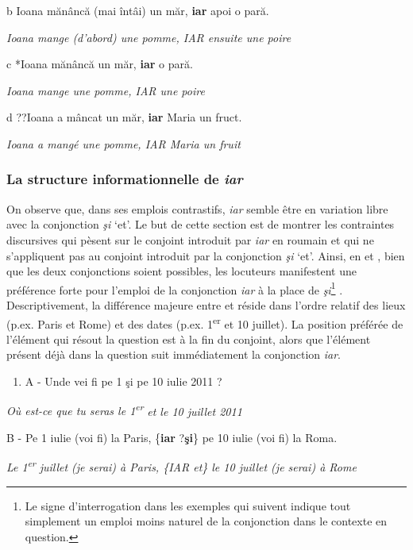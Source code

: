   b  Ioana mănâncă (mai întâi) un măr, \textbf{iar} apoi o pară.

{\itshape
Ioana mange (d'abord) une pomme, IAR ensuite une poire}

  c  *Ioana mănâncă un măr, \textbf{iar} o pară.

    \textit{Ioana mange une pomme, IAR une poire}

  d  ??Ioana a mâncat un măr, \textbf{iar} Maria un fruct.

    \textit{Ioana a mangé une pomme, IAR Maria un fruit}

\subsubsection{La structure informationnelle de \textit{iar} }
On observe que, dans ses emplois contrastifs, \textit{iar} semble être en variation libre avec la conjonction \textit{şi} `et'. Le but de cette section est de montrer les contraintes discursives qui pèsent sur le conjoint introduit par \textit{iar} en roumain et qui ne s'appliquent pas au conjoint introduit par la conjonction \textit{şi} `et'. Ainsi, en  et , bien que les deux conjonctions soient possibles, les locuteurs manifestent une préférence forte pour l'emploi de la conjonction \textit{iar} à la place de \textit{şi}\footnote{Le signe d'interrogation dans les exemples qui suivent indique tout simplement un emploi moins naturel de la conjonction dans le contexte en question. } . Descriptivement, la différence majeure entre  et  réside dans l'ordre relatif des lieux (p.ex. Paris et Rome) et des dates (p.ex. 1\textsuperscript{er} et 10 juillet). La position préférée de l'élément qui résout la question est à la fin du conjoint, alors que l'élément présent déjà dans la question suit immédiatement la conjonction \textit{iar}.


\begin{enumerate}
\item \label{bkm:Ref301969812}A  - Unde vei fi pe 1 şi pe 10 iulie 2011 ?


\end{enumerate}
\textit{Où est-ce que tu seras le 1}\textit{\textsuperscript{er}}\textit{ et le 10 juillet 2011} 

  B  - Pe 1 iulie (voi fi) la Paris, \{\textbf{iar {\textbar}} ?\textbf{şi}\} pe 10 iulie (voi fi) la Roma.

\textit{Le 1}\textit{\textsuperscript{er}}\textit{ juillet (je serai) à Paris, \{IAR {\textbar} et\} le 10 juillet (je serai) à Rome}


